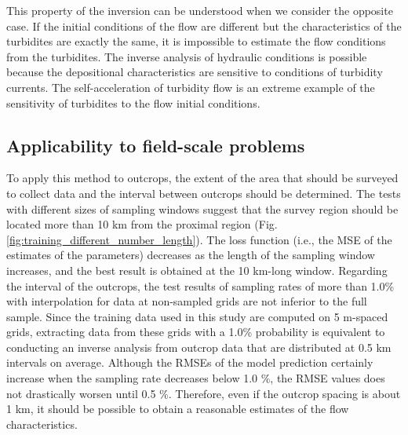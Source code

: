 This property of the inversion can be understood when we consider the opposite case. If the initial conditions of the flow are different but the characteristics of the turbidites are exactly the same, it is impossible to estimate the flow conditions from the turbidites. The inverse analysis of hydraulic conditions is possible because the depositional characteristics are sensitive to conditions of turbidity currents. The self-acceleration of turbidity flow is an extreme example of the sensitivity of turbidites to the flow initial conditions.

\subsection{Applicability to field-scale problems}
To apply this method to outcrops, the extent of the area that should be surveyed to collect data and the interval between outcrops should be determined. The tests with different sizes of sampling windows suggest that the survey region should be located more than 10 km from the proximal region (Fig. \ref{fig:training_different_number_length}). The loss function (i.e., the MSE of the estimates of the parameters) decreases as the length of the sampling window increases, and the best result is obtained at the 10 km-long window. Regarding the interval of the outcrops, the test results of sampling rates of more than 1.0\% with interpolation for data at non-sampled grids are not inferior to the full sample. Since the training data used in this study are computed on 5 m-spaced grids, extracting data from these grids with a 1.0\% probability is equivalent to conducting an inverse analysis from outcrop data that are distributed at 0.5 km intervals on average. Although the RMSEs of the model prediction certainly increase when the sampling rate decreases below 1.0 \%, the RMSE values does not drastically worsen until 0.5 \%. Therefore, even if the outcrop spacing is about 1 km, it should be possible to obtain a reasonable estimates of the flow characteristics.

